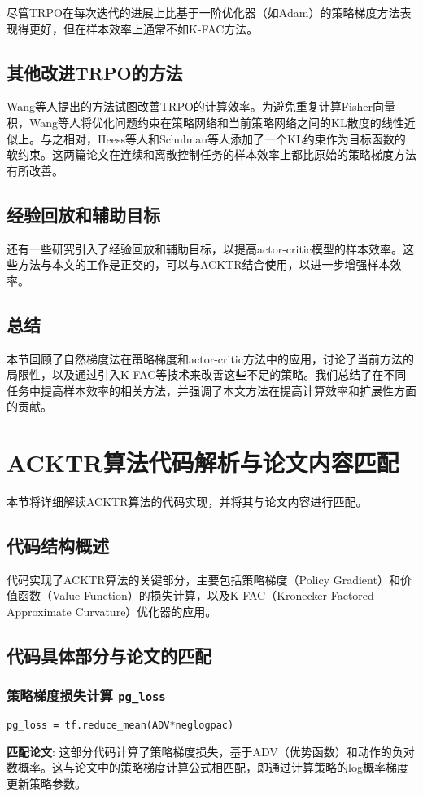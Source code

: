 \documentclass[twocolumn, 10pt]{article} %
\theoremstyle{remark}
\begin{document}
尽管TRPO在每次迭代的进展上比基于一阶优化器（如Adam）的策略梯度方法表现得更好，但在样本效率上通常不如K-FAC方法。

\subsection{其他改进TRPO的方法}
Wang等人提出的方法试图改善TRPO的计算效率。为避免重复计算Fisher向量积，Wang等人将优化问题约束在策略网络和当前策略网络之间的KL散度的线性近似上。与之相对，Heess等人和Schulman等人添加了一个KL约束作为目标函数的软约束。这两篇论文在连续和离散控制任务的样本效率上都比原始的策略梯度方法有所改善。

\subsection{经验回放和辅助目标}
还有一些研究引入了经验回放和辅助目标，以提高actor-critic模型的样本效率。这些方法与本文的工作是正交的，可以与ACKTR结合使用，以进一步增强样本效率。

\subsection{总结}
本节回顾了自然梯度法在策略梯度和actor-critic方法中的应用，讨论了当前方法的局限性，以及通过引入K-FAC等技术来改善这些不足的策略。我们总结了在不同任务中提高样本效率的相关方法，并强调了本文方法在提高计算效率和扩展性方面的贡献。

\section{ACKTR算法代码解析与论文内容匹配}

本节将详细解读ACKTR算法的代码实现，并将其与论文内容进行匹配。

\subsection{代码结构概述}
代码实现了ACKTR算法的关键部分，主要包括策略梯度（Policy Gradient）和价值函数（Value Function）的损失计算，以及K-FAC（Kronecker-Factored Approximate Curvature）优化器的应用。

\subsection{代码具体部分与论文的匹配}

\subsubsection{策略梯度损失计算 \texttt{pg\_loss}}
\begin{lstlisting}[backgroundcolor=\color{lightgray}]
pg_loss = tf.reduce_mean(ADV*neglogpac)
\end{lstlisting}
\noindent \textbf{匹配论文}: 这部分代码计算了策略梯度损失，基于ADV（优势函数）和动作的负对数概率。这与论文中的策略梯度计算公式相匹配，即通过计算策略的log概率梯度更新策略参数。
\end{document}

